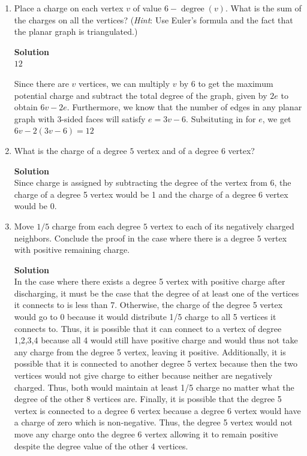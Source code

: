 \documentclass[11pt]{article}
\newenvironment{Parts}{\begin{enumerate}[label=(\alph*)]}{\end{enumerate}}
\newcommand*{\Part}{\item}
\newenvironment{Answer}{\vspace{10pt}\begin{mdframed}\textbf{Solution}\\}{\end{mdframed}\vfill\pagebreak[3]}
\newenvironment{Answer}{\vspace{10pt}}{\vfill\pagebreak[3]}
\begin{document}
\begin{Parts}
\Part Place a charge on each vertex $v$ of value $6-\operatorname{degree}(v)$. What is
the sum of the charges on all the vertices?
(\textit{Hint}: Use Euler's formula and the fact that the planar graph is
triangulated.)

\begin{Answer}
$12$

Since there are $v$ vertices, we can multiply $v$ by 6 to get the maximum potential charge and subtract the total degree of the graph, given by $2e$ to obtain $6v-2e$. Furthermore, we know that the number of edges in any planar graph with 3-sided faces will satisfy $e=3v-6$. Subsituting in for $e$, we get $6v-2(3v-6)=12$
\end{Answer}

\Part What is the charge of a degree $5$ vertex and of a degree $6$ vertex?

\begin{Answer}
Since charge is assigned by subtracting the degree of the vertex from 6, the charge of a degree 5 vertex would be 1 and the charge of a degree 6 vertex would be 0.
\end{Answer}

\Part Move $1/5$ charge from each degree $5$ vertex to each of its negatively charged 
neighbors. Conclude the proof in the case where there is a degree $5$
vertex with positive remaining charge. 

\begin{Answer}
 In the case where there exists a degree 5 vertex with positive charge after discharging, it must be the case that the degree of at least one of the vertices it connects to is less than 7. Otherwise, the charge of the degree 5 vertex would go to 0 because it would distribute 1/5 charge to all 5 vertices it connects to. Thus, it is possible that it can connect to a vertex of degree 1,2,3,4 because all 4 would still have positive charge and would thus not take any charge from the degree 5 vertex, leaving it positive. Additionally, it is possible that it is connected to another degree 5 vertex because then the two vertices would not give charge to either because neither are negatively charged. Thus, both would maintain at least 1/5 charge no matter what the degree of the other 8 vertices are. Finally, it is possible that the degree 5 vertex is connected to a degree 6 vertex because a degree 6 vertex would have a charge of zero which is non-negative. Thus, the degree 5 vertex would not move any charge onto the degree 6 vertex allowing it to remain positive despite the degree value of the other 4 vertices.
\end{Answer}


\end{Parts}
\end{document}
